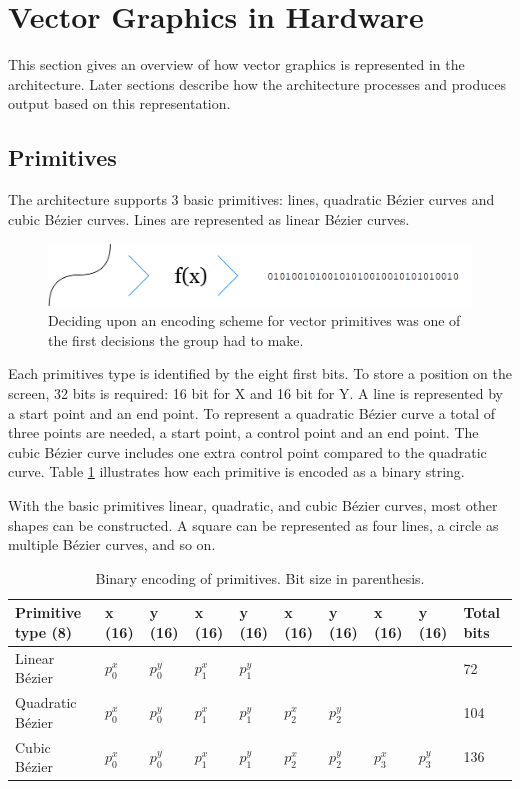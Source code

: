 \section{Vector Graphics in Hardware}

This section gives an overview of how vector graphics is represented in the \vthreek architecture.
Later sections describe how the architecture processes and produces output based on this representation.

\subsection{Primitives}

The \vthreek architecture supports 3 basic primitives: lines, quadratic Bézier curves and cubic Bézier curves.
Lines are represented as linear Bézier curves.

\begin{figure}[h!]
    \centering
    \includegraphics[width=0.8\linewidth]{images/primitive_encoding.png}
    \caption{Deciding upon an encoding scheme for vector primitives was one of the first decisions the group had to make.}
    \label{fig:primitive_encoding}
\end{figure}

Each primitives type is identified by the eight first bits.
To store a position on the screen, 32 bits is required: 16 bit for X and 16 bit for Y.
A line is represented by a start point and an end point.
To represent a quadratic Bézier curve a total of three points are needed, a start point, a control point and an end point.
The cubic Bézier curve includes one extra control point compared to the quadratic curve.
Table \ref{tbl:primitives} illustrates how each primitive is encoded as a binary string.

With the basic primitives linear, quadratic, and cubic Bézier curves, most other shapes can be constructed.
A square can be represented as four lines, a circle as multiple Bézier curves, and so on.

\begin{table}[h]
    \centering
    \begin{tabularx}{\linewidth}{|l|X|X|X|X|X|X|X|X|X|}
    \hline
    Primitive type (8) & x (16) & y (16) & x (16) & y (16) & x (16) & y (16) & x (16) & y (16) & Total bits \\ \hline
    Linear Bézier    & \(p_0^x \) & \(p_0^y \) & \(p_1^x \) & \(p_1^y \) & ~   & ~   & ~   & ~   & 72    \\ \hline
    Quadratic Bézier & \(p_0^x \) & \(p_0^y \) & \(p_1^x \) & \(p_1^y \) & \(p_2^x \) & \(p_2^y \) & ~   & ~   & 104   \\ \hline
    Cubic Bézier     & \(p_0^x \) & \(p_0^y \) & \(p_1^x \) & \(p_1^y \) & \(p_2^x \) & \(p_2^y \) & \(p_3^x \) & \(p_3^y \) & 136   \\ \hline
  \end{tabularx}
    \caption{Binary encoding of primitives. Bit size in parenthesis.}
	\label{tbl:primitives}
\end{table}

